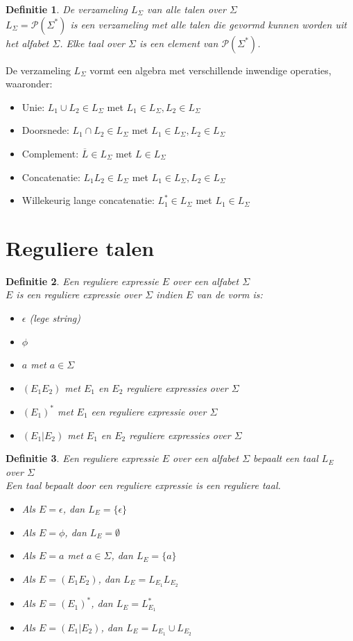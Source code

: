 \documentclass[a4paper]{article}
\newtheorem{tdefinitie}{Definitie}[section]
\newenvironment{definitie}[1]%
  {\begin{mdframed}[backgroundcolor=silver,
    topline=false,
    rightline=false,
    leftline=false,
    bottomline=false]\begin{tdefinitie}#1\\\normalfont}%
  {\end{tdefinitie}\end{mdframed}}
\newcommand{\powerset}{\ensuremath{\mathcal{P}}}
\newcommand{\sstar}{\ensuremath{\Sigma^*}}
\begin{document}
\begin{definitie}{De verzameling $L_\Sigma$ van alle talen over $\Sigma$}
  $L_\Sigma = \powerset(\sstar)$ is een verzameling met alle talen die gevormd kunnen worden uit het alfabet $\Sigma$. Elke taal over $\Sigma$ is een element van $\powerset(\sstar)$.
\end{definitie}

De verzameling $L_\Sigma$ vormt een algebra met verschillende inwendige operaties, waaronder:
\begin{itemize}
\item Unie: $L_1 \cup L_2 \in L_\Sigma$ met $L_1 \in L_\Sigma, L_2 \in L_\Sigma$
\item Doorsnede: $L_1 \cap L_2 \in L_\Sigma$ met $L_1 \in L_\Sigma, L_2 \in L_\Sigma$
\item Complement: $\overline{L} \in L_\Sigma$ met $L \in L_\Sigma$
\item Concatenatie: $L_1L_2 \in L_\Sigma$ met $L_1 \in L_\Sigma, L_2 \in L_\Sigma$
\item Willekeurig lange concatenatie: $L_1^* \in L_\Sigma$ met $L_1 \in L_\Sigma$
\end{itemize}

\newpage\section{Reguliere talen}

\begin{definitie}{Een reguliere expressie $E$ over een alfabet $\Sigma$}
  $E$ is een reguliere expressie over $\Sigma$ indien $E$ van de vorm is:
  \begin{itemize}
  \item $\epsilon$ (lege string)
  \item $\phi$
  \item $a$ met $a \in \Sigma$
  \item $(E_1E_2)$ met $E_1$ en $E_2$ reguliere expressies over $\Sigma$
  \item $(E_1)^*$ met $E_1$ een reguliere expressie over $\Sigma$
  \item $(E_1|E_2)$ met $E_1$ en $E_2$ reguliere expressies over $\Sigma$
  \end{itemize}
\end{definitie}

\begin{definitie}{Een reguliere expressie $E$ over een alfabet $\Sigma$ bepaalt een taal $L_E$ over $\Sigma$}
  Een taal bepaalt door een reguliere expressie is een reguliere taal.
  \begin{itemize}
  \item Als $E = \epsilon$, dan $L_E = \{\epsilon\}$
  \item Als $E = \phi$, dan $L_E = \emptyset$
  \item Als $E = a$ met $a \in \Sigma$, dan $L_E = \{a\}$
  \item Als $E = (E_1E_2)$, dan $L_E = L_{E_1}L_{E_2}$
  \item Als $E = (E_1)^*$, dan $L_E = L_{E_1}^*$
  \item Als $E = (E_1|E_2)$, dan $L_E = L_{E_1} \cup L_{E_2}$
  \end{itemize}
\end{definitie}
\end{document}

